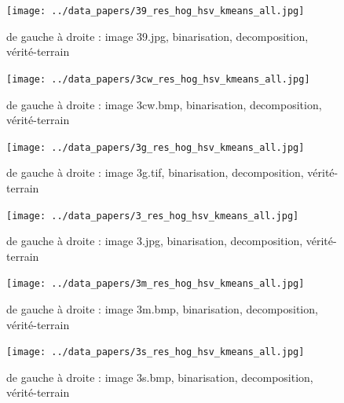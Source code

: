 \documentclass{book}
\begin{document}
\begin{figure}[H]
\begin{center}
\texttt{[image: ../data\_papers/39\_res\_hog\_hsv\_kmeans\_all.jpg]}
\end{center}
\caption{de gauche à droite : image 39.jpg, binarisation, decomposition, vérité-terrain}
\label{39}
\end{figure}
\clearpage


\begin{figure}[H]
\begin{center}
\texttt{[image: ../data\_papers/3cw\_res\_hog\_hsv\_kmeans\_all.jpg]}
\end{center}
\caption{de gauche à droite : image 3cw.bmp, binarisation, decomposition, vérité-terrain}
\label{3cw}
\end{figure}
\clearpage


\begin{figure}[H]
\begin{center}
\texttt{[image: ../data\_papers/3g\_res\_hog\_hsv\_kmeans\_all.jpg]}
\end{center}
\caption{de gauche à droite : image 3g.tif, binarisation, decomposition, vérité-terrain}
\label{3g}
\end{figure}
\clearpage


\begin{figure}[H]
\begin{center}
\texttt{[image: ../data\_papers/3\_res\_hog\_hsv\_kmeans\_all.jpg]}
\end{center}
\caption{de gauche à droite : image 3.jpg, binarisation, decomposition, vérité-terrain}
\label{3}
\end{figure}
\clearpage


\begin{figure}[H]
\begin{center}
\texttt{[image: ../data\_papers/3m\_res\_hog\_hsv\_kmeans\_all.jpg]}
\end{center}
\caption{de gauche à droite : image 3m.bmp, binarisation, decomposition, vérité-terrain}
\label{3m}
\end{figure}
\clearpage


\begin{figure}[H]
\begin{center}
\texttt{[image: ../data\_papers/3s\_res\_hog\_hsv\_kmeans\_all.jpg]}
\end{center}
\caption{de gauche à droite : image 3s.bmp, binarisation, decomposition, vérité-terrain}
\label{3s}
\end{figure}
\clearpage
\end{document}
